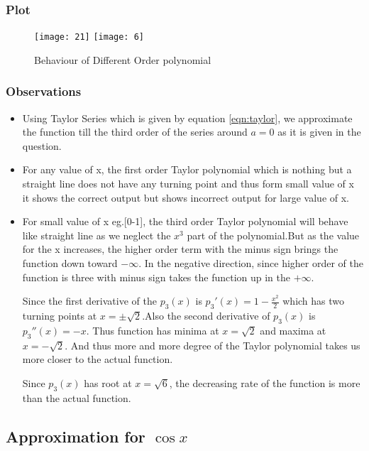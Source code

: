 \documentclass{article}
\begin{document}
\subsubsection{Plot}
\begin{figure}[!h]
    \centering
    \texttt{[image: 21]}
    \texttt{[image: 6]}
    \caption{Behaviour of Different Order polynomial}
    \label{fig:ques3}
\end{figure}

\subsubsection{Observations}
\begin{itemize}
    
    \item Using Taylor Series which is given by equation \ref{eqn:taylor}, we approximate the function till the third order of the series around $a = 0$ as it is given in the question.
    
    
    \item For any value of x, the first order Taylor polynomial which is nothing but a straight line does not have any turning point and thus form small value of x it shows the correct output but shows incorrect output for large value of x. 
    
    \item For small value of x eg.[0-1], the third order Taylor polynomial will behave like straight line as we neglect the $x^3$ part of the polynomial.But as the value for the x increases, the higher order term with the minus sign brings the function down toward $-\infty$. In the negative direction, since higher order of the function is three with minus sign takes the function up in the $+\infty$.
    
    Since the first derivative of the $p_{3}(x)$ is $p_3'(x) =  1 - \frac{x^2}{2}$ which has two turning points at $x = \pm\sqrt{2}$.Also the second derivative of $p_{3}(x)$ is $p_3''(x) =  -x$. Thus function has minima at $x =\sqrt{2}$ and maxima at $x =-\sqrt{2}$. And thus more and more degree of the Taylor polynomial takes us more closer to the actual function.
    
    Since $p_3(x)$ has root at $ x = \sqrt{6}$, the decreasing rate of the function is more than the actual function. 
\newpage    
    
\end{itemize}
\subsection{Approximation for $\cos{x}$}
\end{document}
